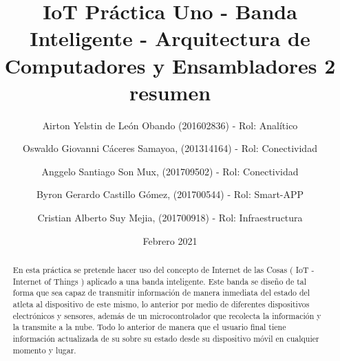 \documentclass[osajnl,twocolumn,showpacs,superscriptaddress,10pt]{revtex4-1}
\begin{document}

\title{\Huge IoT Práctica Uno -  Banda Inteligente - Arquitectura de Computadores y Ensambladores 2 }

\author{\newline Airton Yelstin de León Obando (201602836) - Rol: Analítico}
%

\author{\newline Oswaldo Giovanni Cáceres Samayoa, (201314164) - Rol: Conectividad}%
%
\author{\newline Anggelo Santiago Son Mux, (201709502) - Rol: Conectividad}%
%
\author{\newline Byron Gerardo Castillo Gómez, (201700544) - Rol: Smart-APP}%
%
\author{\newline Cristian Alberto Suy Mejia, (201700918) - Rol: Infraestructura}%
%
\date{Febrero 2021}



\begin{abstract}
\title {resumen}
En esta pr\'actica se pretende hacer uso del concepto de Internet de las Cosas ( IoT - Internet of Things ) aplicado a una banda inteligente. Este banda se diseño de tal forma que sea capaz de transmitir informaci\'on de manera inmediata del estado del atleta al dispositivo de este mismo, lo anterior por medio de diferentes dispositivos electrónicos y sensores, adem\'as de un microcontrolador que recolecta la informaci\'on y la transmite a la nube. Todo lo anterior de manera que el usuario final tiene informaci\'on actualizada de su sobre su estado desde su dispositivo m\'ovil en cualquier momento y lugar.
\end{abstract}
\maketitle{}
\end{document}
